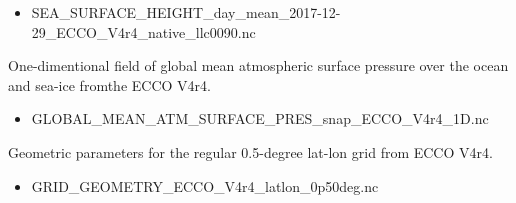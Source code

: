 \begin{itemize}
    \item SEA\_SURFACE\_HEIGHT\_day\_mean\_2017-12-29\_ECCO\_V4r4\_native\_llc0090.nc
\end{itemize}

\par One-dimentional field of global mean atmospheric surface pressure over the ocean and sea-ice fromthe ECCO V4r4.
\begin{itemize}
    \item GLOBAL\_MEAN\_ATM\_SURFACE\_PRES\_snap\_ECCO\_V4r4\_1D.nc
\end{itemize}

\par Geometric parameters for the regular 0.5-degree lat-lon grid from ECCO V4r4.
\begin{itemize}
    \item GRID\_GEOMETRY\_ECCO\_V4r4\_latlon\_0p50deg.nc
\end{itemize}





